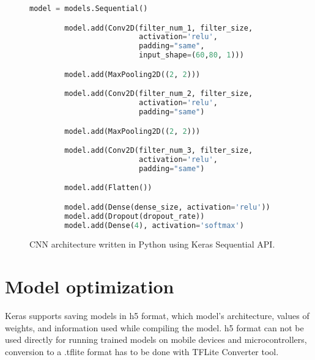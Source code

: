 
\lstset{style=mystyle}

\begin{figure}[ht] 
    \begin{lstlisting}[language=Python]
        model = models.Sequential()

        model.add(Conv2D(filter_num_1, filter_size, 
                         activation='relu', 
                         padding="same", 
                         input_shape=(60,80, 1)))

        model.add(MaxPooling2D((2, 2)))

        model.add(Conv2D(filter_num_2, filter_size, 
                         activation='relu', 
                         padding="same")

        model.add(MaxPooling2D((2, 2)))

        model.add(Conv2D(filter_num_3, filter_size, 
                         activation='relu', 
                         padding="same")

        model.add(Flatten())

        model.add(Dense(dense_size, activation='relu'))
        model.add(Dropout(dropout_rate))
        model.add(Dense(4), activation='softmax')
    \end{lstlisting}
    \caption{ CNN architecture written in Python using Keras Sequential API.}
    \label{model_code}
\end{figure}


\section{ Model optimization}

Keras supports saving models in h5 format, which model's architecture, values of weights, and information used while compiling the model.
h5 format can not be used directly for running trained models on mobile devices and microcontrollers, conversion to a .tflite format has to be done with TFLite Converter tool.

